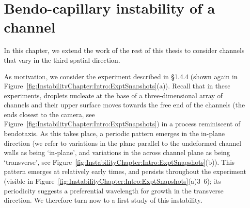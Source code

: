 \graphicspath{{./Sections/Chapter5_instability/figures/}}
\newcommand{\poisson}{\eta} %
\newcommand{\aspect}{a} %
\newcommand{\jump}[1]{_{#1-}^{+}} %
\newcommand{\amplitude}{\delta} %

 \renewcommand{\familydefault}{\sfdefault}


\newcommand{\h}{h}
\newcommand{\x}{x}
\newcommand{\y}{y}
\newcommand{\that}{t}
\newcommand{\nablahat}{\nabla}

\newcommand{\X}{X} %
\renewcommand{\K}{K} %

\newcommand{\GG}{\psi} %
\newcommand{\GGG}{\upsilon} %
\chapter{Bendo-capillary instability of a channel}

In this chapter, we extend the work of the rest of this thesis to consider channels that vary in the third spatial direction.

As motivation, we consider the experiment described in \S 1.4.4 (shown again in Figure~\ref{fig:InstabilityChapter:Intro:ExptSnapshots}(a)). Recall that in these experiments, droplets nucleate at the base of a three-dimensional array of channels and their upper surface moves towards the free end of the channels (the ends closest to the camera, see Figure~\ref{fig:InstabilityChapter:Intro:ExptSnapshots}) in a process reminiscent of bendotaxis. As this takes place, a periodic pattern emerges in the in-plane direction (we refer to variations in the plane parallel to the undeformed channel walls as being `in-plane', and variations in the across channel plane as being `transverse', see Figure~\ref{fig:InstabilityChapter:Intro:ExptSnapshots}(b)). This pattern emerges at relatively early times, and persists throughout the experiment (visible in Figure~\ref{fig:InstabilityChapter:Intro:ExptSnapshots}(a)3--6); its periodicity suggests a preferential wavelength for growth in the transverse direction. We therefore turn now to a first study of this instability.

